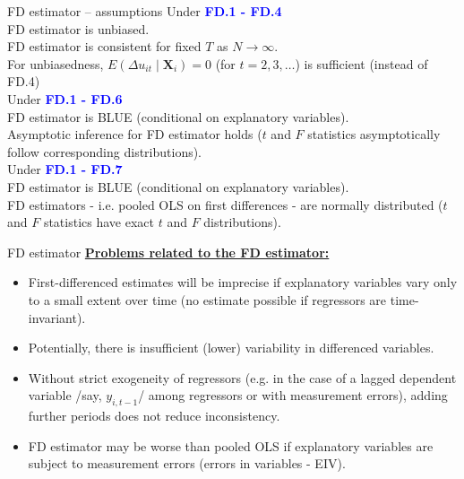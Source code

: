 \documentclass[usenames,dvipsnames]{beamer}
\begin{document}
\begin{frame}{FD estimator – assumptions}
Under  \textcolor{Blue}{\textbf{FD.1 - FD.4}}\\
FD estimator is unbiased. \\
FD estimator is consistent for fixed $T$ as $N \rightarrow \infty$.\\
For unbiasedness, $E (\Delta u_{it} \mid \bm{X}_i) = 0$ (for $t = 2,3, \dots$) is sufficient (instead of FD.4)\\
\medskip
Under \textcolor{Blue}{\textbf{FD.1 - FD.6}}\\
FD estimator is BLUE (conditional on explanatory variables).\\
Asymptotic inference for FD estimator holds ($t$ and $F$ statistics asymptotically follow corresponding distributions).\\
\medskip
Under  \textcolor{Blue}{\textbf{FD.1 - FD.7}}\\
FD estimator is BLUE (conditional on explanatory variables).\\
FD estimators - i.e. pooled OLS on first differences - are normally distributed ($t$ and $F$ statistics have exact $t$ and $F$ distributions).
\end{frame}
\begin{frame}{FD estimator}
\underline{\textbf{Problems related to the FD estimator:}}
\begin{itemize}
\item First-differenced estimates will be imprecise if explanatory variables vary only to a small extent over time (no estimate possible if regressors are time-invariant).
\item Potentially, there is insufficient (lower) variability in differenced variables.
\item Without strict exogeneity of regressors (e.g. in the case of a lagged dependent variable /say, $y_{i,t-1}$/ among regressors or with measurement errors), adding further periods does not reduce inconsistency.
\item FD estimator may be worse than pooled OLS if explanatory variables are subject to measurement errors (errors in variables - EIV).
\end{itemize}
\end{frame}
\end{document}
